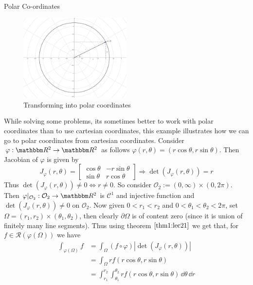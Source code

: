 \documentclass[Analysis-3]{subfiles}
\begin{document}
\begin{Eg}{Polar Co-ordinates}{}
    \begin{figure}
        \centering
        \includegraphics[width=0.5\textwidth]{figures/lec21.1.png}
        \caption{Transforming into polar coordinates}
        \label{fig1:21}
    \end{figure}
    While solving some problems, its sometimes better to work with polar coordinates than to use cartesian coordinates, this example illustrates how we can go to polar coordinates from cartesian coordinates.
    Consider $\varphi : \R^2 \to \R^2$ as follows $\varphi(r,\theta) = (r \cos\theta, r \sin\theta)$. Then Jacobian of $\varphi$ is given by
    \[
        J_{\varphi}(r,\theta) = \begin{bmatrix}
            \cos\theta & -r\sin\theta \\ 
            \sin\theta & r\cos\theta 
        \end{bmatrix} \Rightarrow \det(J_{\varphi}(r,\theta)) = r   
    \]
    Thus $\det(J_{\varphi}(r,\theta)) \neq 0 \Leftrightarrow r \neq 0$. So consider $\mathcal{O}_2 := (0,\infty) \times (0,2\pi)$. Then $\varphi\vert_{\mathcal{O}_2} : \mathcal{O}_2 \to \R^2$ is $\mathscr{C}^1$ and injective function and $\det(J_{\varphi}(r,\theta)) \neq 0 $ on $\mathcal{O}_2$. Now given $0 < r_1 < r_2$ and $0 < \theta_1 < \theta_2 < 2\pi$, set $\Omega = (r_1, r_2) \times (\theta_1, \theta_2)$, then clearly $\partial \Omega$ is of content zero (since it is union of finitely many line segments). Thus using theorem $\ref{thm1:lec21}$ we get that, for $f \in \mathscr{R}(\varphi(\Omega))$ we have 
    \begin{align*}
        \int_{\varphi(\Omega)} f &= \int_{\Omega} (f \circ \varphi) |\det (J_{\varphi}(r,\theta))| \\ 
        &= \int_{\Omega} r f(r\cos\theta, r\sin\theta) \\ 
        &= \int_{r_1}^{r_2} \int_{\theta_1}^{\theta_2} r f(r\cos\theta, r\sin\theta)\, \dd\theta \, \dd r
    \end{align*} 


\end{Eg}
\end{document}
